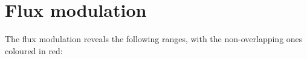 \documentclass{scrartcl}
\begin{document}
\section{Flux modulation}
	The flux modulation reveals the following ranges, with the non-overlapping ones coloured in red:
	\def\barplot#1#2{\tikz[baseline,x=0.02\linewidth,y=0.02\linewidth]{\begin{scope}[yshift=-0.25ex]\filldraw[thick, red]#1;\end{scope}\begin{scope}[yshift=0.25ex]\filldraw[thick, blue]#2;\end{scope} \path(-16.7,0) -- (29.15,0);\draw (0,-0.75ex) -- (0,0.75ex);}}
	\begin{longtable}{p{0.2\linewidth}p{0.8\linewidth}}
		
	\end{longtable}
	\printbibliography
\end{document}
